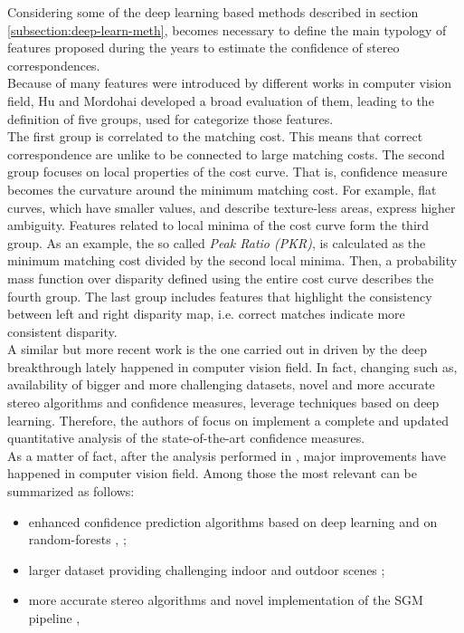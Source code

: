 Considering some of the deep learning based methods described in section \ref{subsection:deep-learn-meth}, becomes necessary to define the main typology of features proposed during the years to estimate the confidence of stereo correspondences. \\
Because of many features were introduced by different works in computer vision field, Hu and Mordohai \cite{Hu2012} developed a broad evaluation of them, leading to the definition of five groups, used for categorize those features. \\
The first group is correlated to the matching cost. 
This means that correct correspondence are unlike to be connected to large matching costs. 
The second group focuses on local properties of the cost curve. 
That is, confidence measure becomes the curvature around the minimum matching cost. 
For example, flat curves, which have smaller values, and describe texture-less areas, express higher ambiguity.
Features related to local minima of the cost curve form the third group. 
As an example, the so called \textit{Peak Ratio (PKR)}, is calculated as the minimum matching cost divided by the second local minima.
Then, a probability mass function over disparity defined using the entire cost curve describes the fourth group.
The last group includes features that highlight the consistency between left and right disparity map, i.e. correct matches indicate more consistent disparity.\\
A similar but more recent work is the one carried out in \cite{Poggi2017} driven by the deep breakthrough lately happened in computer vision field. 
In fact, changing such as, availability of bigger and more challenging datasets, novel and more accurate stereo algorithms and confidence measures, leverage techniques based on deep learning.
Therefore, the authors of \cite{Poggi2017} focus on implement a complete and updated quantitative analysis of the state-of-the-art confidence measures.\\
As a matter of fact, after the analysis performed in \cite{Hu2012}, major improvements have happened in computer vision field.
Among those the most relevant can be summarized as follows:
\begin{itemize}
	\item enhanced confidence prediction algorithms based on deep learning \cite{poggi2016learning} and on random-forests \cite{Spyropoulos2014}, \cite{Park2015};
	\item larger dataset providing challenging indoor and outdoor scenes \cite{Mayer2016};
	\item more accurate stereo algorithms and novel implementation of the SGM pipeline \cite{Seki2016}, \cite{Zbontar2016}
\end{itemize}
